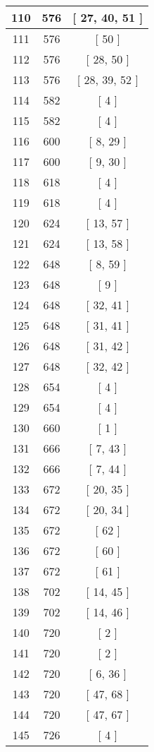 \begin{center}
\begin{longtable}[H]{|| c c c ||}
\hline
110 & 576 & [ 27, 40, 51 ] \\ 
\hline
111 & 576 & [ 50 ] \\ 
\hline
112 & 576 & [ 28, 50 ] \\ 
\hline
113 & 576 & [ 28, 39, 52 ] \\ 
\hline
114 & 582 & [ 4 ] \\ 
\hline
115 & 582 & [ 4 ] \\ 
\hline
116 & 600 & [ 8, 29 ] \\ 
\hline
117 & 600 & [ 9, 30 ] \\ 
\hline
118 & 618 & [ 4 ] \\ 
\hline
119 & 618 & [ 4 ] \\ 
\hline
120 & 624 & [ 13, 57 ] \\ 
\hline
121 & 624 & [ 13, 58 ] \\ 
\hline
122 & 648 & [ 8, 59 ] \\ 
\hline
123 & 648 & [ 9 ] \\ 
\hline
124 & 648 & [ 32, 41 ] \\ 
\hline
125 & 648 & [ 31, 41 ] \\ 
\hline
126 & 648 & [ 31, 42 ] \\ 
\hline
127 & 648 & [ 32, 42 ] \\ 
\hline
128 & 654 & [ 4 ] \\ 
\hline
129 & 654 & [ 4 ] \\ 
\hline
130 & 660 & [ 1 ] \\ 
\hline
131 & 666 & [ 7, 43 ] \\ 
\hline
132 & 666 & [ 7, 44 ] \\ 
\hline
133 & 672 & [ 20, 35 ] \\ 
\hline
134 & 672 & [ 20, 34 ] \\ 
\hline
135 & 672 & [ 62 ] \\ 
\hline
136 & 672 & [ 60 ] \\ 
\hline
137 & 672 & [ 61 ] \\ 
\hline
138 & 702 & [ 14, 45 ] \\ 
\hline
139 & 702 & [ 14, 46 ] \\ 
\hline
140 & 720 & [ 2 ] \\ 
\hline
141 & 720 & [ 2 ] \\ 
\hline
142 & 720 & [ 6, 36 ] \\ 
\hline
143 & 720 & [ 47, 68 ] \\ 
\hline
144 & 720 & [ 47, 67 ] \\ 
\hline
145 & 726 & [ 4 ] \\ 
\hline

\end{longtable}
\end{center}
